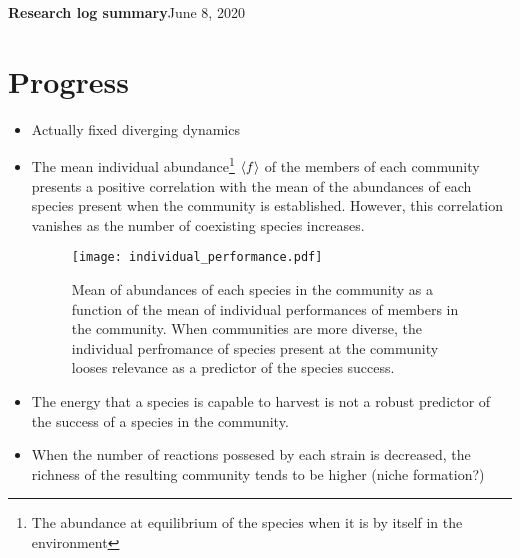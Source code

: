 \documentclass[10pt,letterpaper]{article}
\begin{document}
	
    \LARGE{\textbf{Research log summary}}\hfill\Large{June 8, 2020}
    \section*{Progress}
		\begin{itemize}
			\item Actually fixed diverging dynamics
			\item The mean individual abundance\footnote{The abundance at equilibrium of the species when it is by itself in the environment} $ \braket{f} $ of the members of each community  presents a positive correlation with the mean of the abundances of each species present when the community is established. However, this correlation vanishes as the number of coexisting species increases.
			    	\begin{figure}[h]
				\centering
				\texttt{[image: individual\_performance.pdf]}
				\caption{Mean of abundances of each species in the community as a function of the mean of individual performances of members in the community. When communities are more diverse, the individual perfromance of species present at the community looses relevance as a predictor of the species success.}
				\label{fig:individual_performance}
			\end{figure}
			\item The energy that a species is capable to harvest is not a robust predictor of the success of a species  in the community.
			\item When the number of reactions possesed by each strain is decreased, the richness of the resulting community tends to be higher (niche formation?)
    	\end{itemize}
\end{document}
